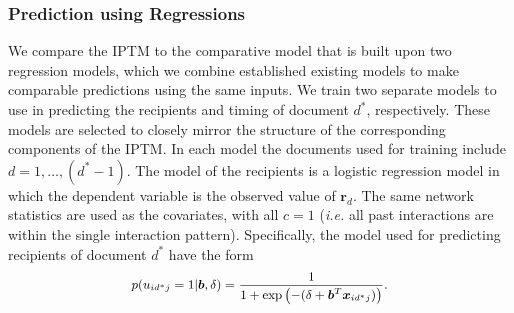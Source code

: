 \documentclass[twoside]{article}
\begin{document}
     \subsubsection{Prediction using Regressions} \label{subsubsec: Prediction using Regressions}
     We compare the IPTM to the comparative model that is built upon two regression models, which we combine established existing models to make comparable predictions using the same inputs. We train two separate models to use in predicting the recipients and timing of document $d^*$, respectively. These models are selected to closely mirror the structure of the corresponding components of the IPTM. In each model the documents used for training include $d=1,\ldots, (d^*-1)$. The model of the recipients is a logistic regression model in which the dependent variable is the observed value of $\boldsymbol{r}_{d}$. The same network statistics are used as the covariates, with all $c=1$ (\textit{i.e. } all past interactions are within the single interaction pattern). Specifically, the model used for predicting recipients of document $d^*$ have the form 
     \begin{equation*}
       	 \footnotesize
     p(u_{id^*j}=1|\boldsymbol{b}, \delta)=\frac{1}{1+\exp\left(-(\delta+\boldsymbol{b}^T\boldsymbol{x}_{id^*j})\right)}.
     \label{eqn:predrec}
     \end{equation*}
     
\end{document}

